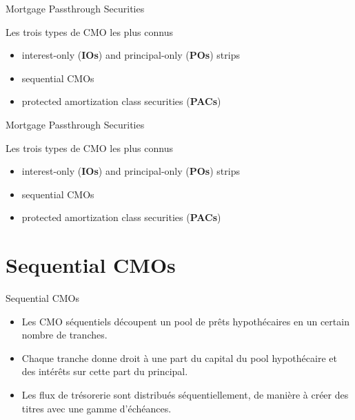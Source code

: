 \documentclass[10pt,a4paper]{beamer}
\begin{document}
\begin{frame}{Mortgage Passthrough Securities}
\begin{block}{Les trois types de CMO les plus connus}
\begin{itemize}[label=\bullet]
\item interest-only (\textbf{IOs}) and principal-only (\textbf{POs}) strips

\item sequential CMOs

\item protected amortization class securities (\textbf{PACs})
\end{itemize}
\end{block}
\end{frame}


\begin{frame}{Mortgage Passthrough Securities}
\begin{block}{Les trois types de CMO les plus connus}
\begin{itemize}[label=\bullet]
\item interest-only (\textbf{IOs}) and principal-only (\textbf{POs}) strips
\item sequential CMOs
\item protected amortization class securities (\textbf{PACs})
\end{itemize}
\end{block}
\end{frame}

\section{Sequential CMOs}

\begin{frame}{Sequential CMOs}
\begin{itemize}[label=\bullet]
\item Les CMO séquentiels découpent un pool de prêts hypothécaires en un certain nombre de tranches.

\vspace{0.5cm}

\item Chaque tranche donne droit à une part du capital du pool hypothécaire et des intérêts sur cette part du principal.

\vspace{0.5cm}

\item Les flux de trésorerie sont distribués séquentiellement, de manière à créer des titres avec une gamme d'échéances.
\end{itemize}
\end{frame}
\end{document}
